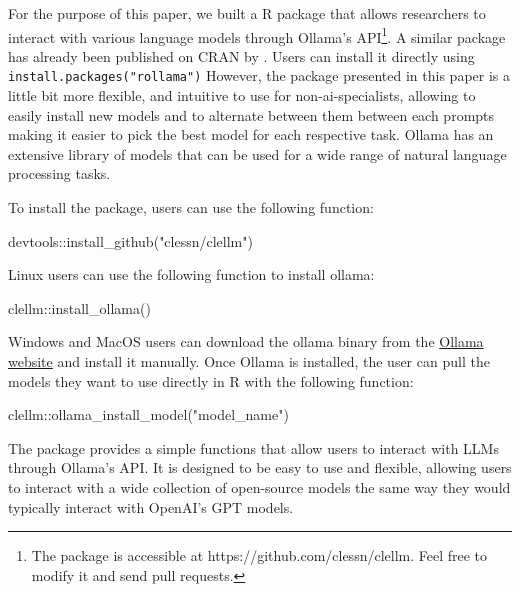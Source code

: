 \documentclass[
  authoryear,
  preprint,
  3p]{elsarticle}
\newenvironment{Shaded}{\begin{snugshade}}{\end{snugshade}}
\newcommand{\FunctionTok}[1]{\textcolor[rgb]{0.28,0.35,0.67}{#1}}
\newcommand{\NormalTok}[1]{\textcolor[rgb]{0.00,0.23,0.31}{#1}}
\newcommand{\SpecialCharTok}[1]{\textcolor[rgb]{0.37,0.37,0.37}{#1}}
\newcommand{\StringTok}[1]{\textcolor[rgb]{0.13,0.47,0.30}{#1}}
\begin{document}
For the purpose of this paper, we built a R package that allows
researchers to interact with various language models through Ollama's
API\footnote{The package is accessible at
  https://github.com/clessn/clellm. Feel free to modify it and send pull
  requests.}. A similar package has already been published on CRAN by
\citet{gruber_weber24}. Users can install it directly using
\texttt{install.packages("rollama")} However, the package presented in
this paper is a little bit more flexible, and intuitive to use for
non-ai-specialists, allowing to easily install new models and to
alternate between them between each prompts making it easier to pick the
best model for each respective task. Ollama has an extensive library of
models that can be used for a wide range of natural language processing
tasks.

To install the package, users can use the following function:

\begin{Shaded}
\begin{Highlighting}[]
\NormalTok{devtools}\SpecialCharTok{::}\FunctionTok{install\_github}\NormalTok{(}\StringTok{"clessn/clellm"}\NormalTok{)}
\end{Highlighting}
\end{Shaded}

Linux users can use the following function to install ollama:

\begin{Shaded}
\begin{Highlighting}[]
\NormalTok{clellm}\SpecialCharTok{::}\FunctionTok{install\_ollama}\NormalTok{()}
\end{Highlighting}
\end{Shaded}

Windows and MacOS users can download the ollama binary from the
\href{https://ollama.com/}{Ollama website} and install it manually. Once
Ollama is installed, the user can pull the models they want to use
directly in R with the following function:

\begin{Shaded}
\begin{Highlighting}[]
\NormalTok{clellm}\SpecialCharTok{::}\FunctionTok{ollama\_install\_model}\NormalTok{(}\StringTok{"model\_name"}\NormalTok{)}
\end{Highlighting}
\end{Shaded}

The package provides a simple functions that allow users to interact
with LLMs through Ollama's API. It is designed to be easy to use and
flexible, allowing users to interact with a wide collection of
open-source models the same way they would typically interact with
OpenAI's GPT models.
\end{document}
